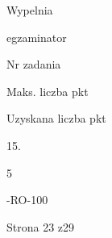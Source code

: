 \documentclass[a4paper,12pt]{article}
\begin{document}
Wypelnia

egzaminator

Nr zadania

Maks. liczba pkt

Uzyskana liczba pkt

15.

5

-RO-100

Strona 23 z29
\end{document}
